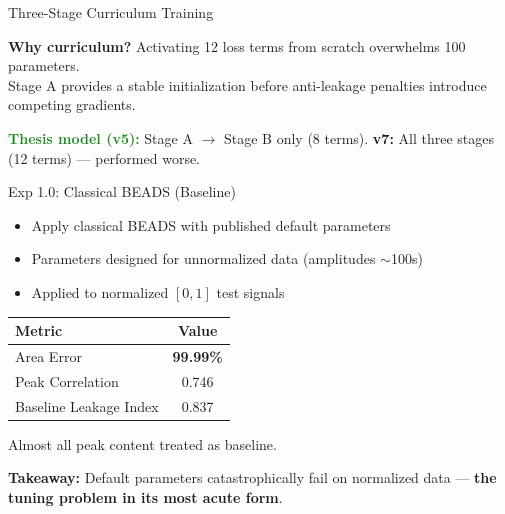 \documentclass[aspectratio=169, 10pt]{beamer}
\begin{document}
\begin{frame}{Three-Stage Curriculum Training}
\vspace{0.8em}
\begin{insightbox}
\centering
\textbf{Why curriculum?} Activating 12 loss terms from scratch overwhelms 100 parameters.\\[3pt]
Stage A provides a stable initialization before anti-leakage penalties introduce competing gradients.
\end{insightbox}

\vspace{0.3em}
{\small\textcolor{forestgreen}{\textbf{Thesis model (v5):}} Stage A $\rightarrow$ Stage B only (8 terms). \quad
\textcolor{warningred}{\textbf{v7:}} All three stages (12 terms) --- performed worse.}
\end{frame}

\begin{frame}{Exp 1.0: Classical BEADS (Baseline)}
\begin{itemize}
  \item Apply classical BEADS with published default parameters
  \item Parameters designed for unnormalized data (amplitudes $\sim$100s)
  \item Applied to normalized $[0,1]$ test signals
\end{itemize}

\vspace{0.8em}
\begin{resultbad}
\centering
\begin{tabular}{lc}
\toprule
\textbf{Metric} & \textbf{Value} \\
\midrule
Area Error & \textbf{99.99\%} \\
Peak Correlation & 0.746 \\
Baseline Leakage Index & 0.837 \\
\bottomrule
\end{tabular}
\vspace{0.3em}

Almost all peak content treated as baseline.
\end{resultbad}

\vspace{0.5em}
\textbf{Takeaway:} Default parameters catastrophically fail on normalized data --- \textbf{the tuning problem in its most acute form}.
\end{frame}
\end{document}
